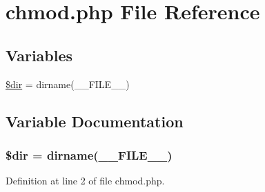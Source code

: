 \hypertarget{chmod_8php}{\section{chmod.\+php File Reference}
\label{chmod_8php}
}
\subsection*{Variables}
\begin{DoxyCompactItemize}
\item 
\hyperlink{chmod_8php_a1659f0a629d408e0f849dbe4ee061e62}{\$dir} = dirname(\+\_\+\+\_\+\+F\+I\+L\+E\+\_\+\+\_\+)
\end{DoxyCompactItemize}


\subsection{Variable Documentation}
\hypertarget{chmod_8php_a1659f0a629d408e0f849dbe4ee061e62}{
\subsubsection[{\$dir}]{\setlength{\rightskip}{0pt plus 5cm}\$dir = dirname(\+\_\+\+\_\+\+F\+I\+L\+E\+\_\+\+\_\+)}}\label{chmod_8php_a1659f0a629d408e0f849dbe4ee061e62}


Definition at line 2 of file chmod.\+php.

